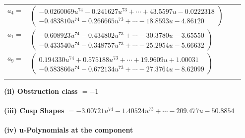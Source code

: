 \documentclass[1p]{elsarticle_modified}
\theoremstyle{definition}
\begin{document}
\begin{tabular}{m{7pt} m{180pt} m{7pt} m{180pt} }
\flushright $a_{4}=$&$\begin{pmatrix}-0.0260069 u^{74}-0.241627 u^{73}+\cdots+43.5597 u-0.0222318\\-0.483810 u^{74}-0.266665 u^{73}+\cdots-18.8593 u-4.86120\end{pmatrix}$ \\
\flushright $a_{1}=$&$\begin{pmatrix}-0.608923 u^{74}-0.434802 u^{73}+\cdots-30.3780 u-3.65550\\-0.433540 u^{74}-0.348757 u^{73}+\cdots-25.2954 u-5.66632\end{pmatrix}$ \\
\flushright $a_{9}=$&$\begin{pmatrix}0.194330 u^{74}+0.575188 u^{73}+\cdots+19.9609 u+1.00031\\-0.583866 u^{74}-0.672134 u^{73}+\cdots-27.3764 u-8.62099\end{pmatrix}$\\&\end{tabular}
\flushleft \textbf{(ii) Obstruction class $= -1$}\\~\\
\flushleft \textbf{(iii) Cusp Shapes $= -3.00721 u^{74}-1.40524 u^{73}+\cdots-209.477 u-50.8854$}\\~\\
\newpage\renewcommand{\arraystretch}{1}
\flushleft \textbf{(iv) u-Polynomials at the component}\newline \\
\end{document}
